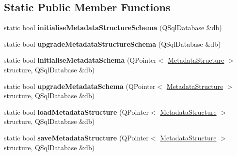 \subsection*{Static Public Member Functions}
\begin{DoxyCompactItemize}
\item 
\mbox{\label{class_s_q_l_serialiser_metadata_structure_a1678d55be522adf1e3e5372066f6f2b7}} 
static bool {\bfseries initialise\+Metadata\+Structure\+Schema} (Q\+Sql\+Database \&db)
\item 
\mbox{\label{class_s_q_l_serialiser_metadata_structure_ab5c2d18f3a18eb159f05a5fe10e891d9}} 
static bool {\bfseries upgrade\+Metadata\+Structure\+Schema} (Q\+Sql\+Database \&db)
\item 
\mbox{\label{class_s_q_l_serialiser_metadata_structure_a6cac712f873dffc2800a7e199a8a9c5b}} 
static bool {\bfseries initialise\+Metadata\+Schema} (Q\+Pointer$<$ \hyperlink{class_metadata_structure}{Metadata\+Structure} $>$ structure, Q\+Sql\+Database \&db)
\item 
\mbox{\label{class_s_q_l_serialiser_metadata_structure_acd08aa4e88149e89f572c150e1c18f0c}} 
static bool {\bfseries upgrade\+Metadata\+Schema} (Q\+Pointer$<$ \hyperlink{class_metadata_structure}{Metadata\+Structure} $>$ structure, Q\+Sql\+Database \&db)
\item 
\mbox{\label{class_s_q_l_serialiser_metadata_structure_a8773bf5dd7f9a0ca775bd593b22b86e3}} 
static bool {\bfseries load\+Metadata\+Structure} (Q\+Pointer$<$ \hyperlink{class_metadata_structure}{Metadata\+Structure} $>$ structure, Q\+Sql\+Database \&db)
\item 
\mbox{\label{class_s_q_l_serialiser_metadata_structure_a9bef8edae3095a3c70593e1318a192a9}} 
static bool {\bfseries save\+Metadata\+Structure} (Q\+Pointer$<$ \hyperlink{class_metadata_structure}{Metadata\+Structure} $>$ structure, Q\+Sql\+Database \&db)
\item 
\mbox{\label{class_s_q_l_serialiser_metadata_structure_a462c826f60c1eefa8261e54b0f9d2de7}} 

\end{DoxyCompactItemize}
